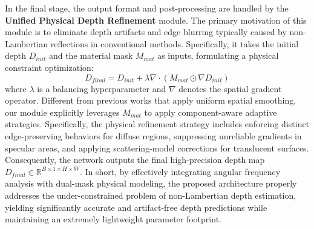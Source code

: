 \documentclass[lettersize,journal]{IEEEtran}
\begin{document}
In the final stage, the output format and post-processing are handled by the \textbf{Unified Physical Depth Refinement} module. The primary motivation of this module is to eliminate depth artifacts and edge blurring typically caused by non-Lambertian reflections in conventional methods. Specifically, it takes the initial depth $D_{init}$ and the material mask $M_{mat}$ as inputs, formulating a physical constraint optimization:
\begin{equation}
\label{eq:eq5}
D_{final} = D_{init} + \lambda \nabla \cdot (M_{mat} \odot \nabla D_{init})
\end{equation}
where $\lambda$ is a balancing hyperparameter and $\nabla$ denotes the spatial gradient operator. Different from previous works that apply uniform spatial smoothing, our module explicitly leverages $M_{mat}$ to apply component-aware adaptive strategies. Specifically, the physical refinement strategy includes enforcing distinct edge-preserving behaviors for diffuse regions, suppressing unreliable gradients in specular areas, and applying scattering-model corrections for translucent surfaces. Consequently, the network outputs the final high-precision depth map $D_{final} \in \mathbb{R}^{B \times 1 \times H \times W}$. In short, by effectively integrating angular frequency analysis with dual-mask physical modeling, the proposed architecture properly addresses the under-constrained problem of non-Lambertian depth estimation, yielding significantly accurate and artifact-free depth predictions while maintaining an extremely lightweight parameter footprint.
\end{document}
